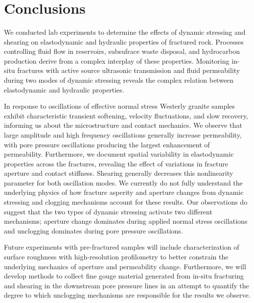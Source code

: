 \documentclass[letterpaper,10pt]{article}
\begin{document}
\clearpage


\section{Conclusions}
\paragraph{}
We  conducted lab experiments to determine the effects of dynamic stressing and shearing on elastodynamic and hydraulic properties of fractured rock. Processes controlling fluid flow in reservoirs, subsufrace waste disposal, and hydrocarbon production derive from a complex interplay of these properties. Monitoring in-situ fractures with active source ultrasonic transmission and fluid permeability during two modes of dynamic stressing reveals the complex relation between elastodynamic and hydraulic properties. 

In response to oscillations of effective normal stress Westerly granite samples exhibit characteristic transient softening, velocity fluctuations, and slow recovery, informing us about the microstructure and contact mechanics. We observe that large amplitude and high frequency oscillations generally increase permeability, with pore pressure oscillations producing the largest enhancement of permeability. Furthermore, we document spatial variability in elastodynamic properties across the fractures, revealing the effect of variations in fracture aperture and contact stiffness. Shearing generally decreases this nonlinearity parameter for both oscillation modes.
We currently do not fully understand the underlying physics of how fracture asperity and aperture changes from dynamic stressing and clogging mechanisms account for these results. Our observations do suggest that the two types of dynamic stressing activate two different mechanisms; aperture change dominates during applied normal stress oscillations and unclogging dominates during pore pressure oscillations. 

Future experiments with pre-fractured samples will include characterization of surface roughness with high-resolution profilometry to better constrain the underlying mechanics of aperture and permeability change. Furthermore, we will develop methods to collect fine gouge material generated from in-situ fracturing and shearing in the downstream pore pressure lines in an attempt to quantify the degree to which unclogging mechanisms are responsible for the results we observe.
\clearpage
\end{document}
